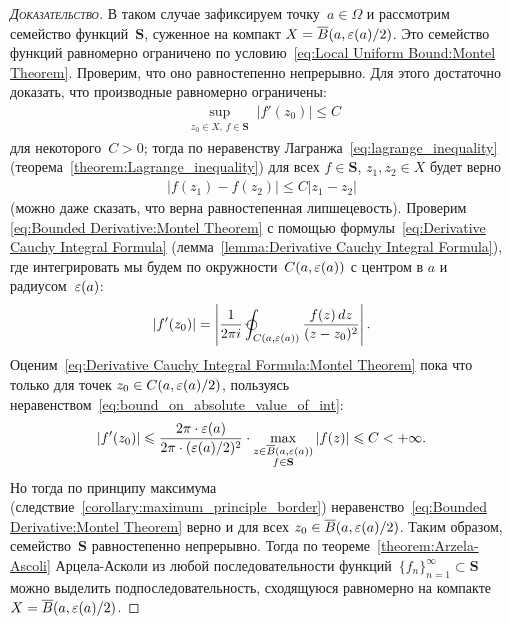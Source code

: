 \documentclass[../complex-analysis.tex]{subfiles}
\begin{document}
\begin{proof}[\normalfont\textsc{Доказательство}]
 В таком случае зафиксируем точку~$ a \in \Omega $ и рассмотрим семейство функций~$\mathbf S$, суженное на компакт $ X = \overline{B}(a, \varepsilon(a) / 2) $. Это семейство функций равномерно ограничено по условию~\eqref{eq:Local Uniform Bound:Montel Theorem}. Проверим, что оно равностепенно непрерывно. Для этого достаточно доказать, что производные равномерно ограничены:
 \begin{align}
  \label{eq:Bounded Derivative:Montel Theorem}
  \sup_{\substack{z_0 \in X,\, f \in \mathbf S}}\left| f'(z_0) \right| \leqslant C
 \end{align} для некоторого~$ C > 0 $; тогда по неравенству Лагранжа~\eqref{eq:lagrange_inequality} (теорема~\ref{theorem:Lagrange_inequality}) для всех $ f \in \mathbf S $, $ z_1,z_2 \in X $ будет верно
 \begin{align*}
  \left| f(z_1) - f(z_2) \right| \leqslant C \left| z_1 - z_2 \right|
 \end{align*} (можно даже сказать, что верна равностепенная липшецевость). Проверим \eqref{eq:Bounded Derivative:Montel Theorem} с помощью формулы~\eqref{eq:Derivative Cauchy Integral Formula} (лемма~\ref{lemma:Derivative Cauchy Integral Formula}), где интегрировать мы будем по окружности~$ C(a,\varepsilon(a)) $ с центром в $ a $ и радиусом~$ \varepsilon(a) $:
 \begin{align}
  \label{eq:Derivative Cauchy Integral Formula:Montel Theorem}
  \left| f'(z_0) \right| = \left| \frac{1}{2\pi i} \varointctrclockwise_{C(a,\eps(a))} \frac{f(z)\,dz}{(z-z_0)^{2}}   \right|.
 \end{align} Оценим~\eqref{eq:Derivative Cauchy Integral Formula:Montel Theorem} пока что только для точек $ z_0 \in C(a, \varepsilon(a) / 2) $, пользуясь неравенством~\eqref{eq:bound_on_absolute_value_of_int}:
 \begin{align*}
  \left| f'(z_0) \right| \leqslant \frac{2\pi \cdot \varepsilon(a)}{2\pi \cdot (\varepsilon(a) / 2)^{2}} \cdot \max_{\substack{z \in \overline B(a,\varepsilon(a)) \\ f \in \mathbf S}} \left| f(z) \right| \leqslant C < +\infty.
 \end{align*} Но тогда по принципу максимума (следствие~\ref{corollary:maximum_principle_border}) неравенство~\eqref{eq:Bounded Derivative:Montel Theorem} верно и для всех $ z_0 \in \overline B(a, \varepsilon(a) / 2) $. Таким образом, семейство~$ \mathbf S $ равностепенно непрерывно. Тогда по теореме~\ref{theorem:Arzela-Ascoli} Арцела-Асколи из любой последовательности функций~$ \{f_{n}\}_{n=1}^{\infty} \subset \mathbf S $  можно выделить подпоследовательность, сходящуюся равномерно на компакте~$ X = \overline B(a,\varepsilon(a) / 2) $.
\end{proof}
\end{document}
